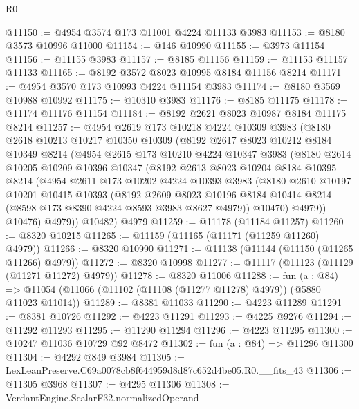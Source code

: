 \begin{lexlean}{R0}
\begin{coremodule}
@11150 := @4954 @3574 @173 @11001 @4224 @11133 @3983
@11153 := @8180 @3573 @10996 @11000
@11154 := @146 @10990
@11155 := @3973 @11154
@11156 := @11155 @3983
@11157 := @8185 @11156
@11159 := @11153 @11157 @11133
@11165 := @8192 @3572 @8023 @10995 @8184 @11156 @8214
@11171 := @4954 @3570 @173 @10993 @4224 @11154 @3983
@11174 := @8180 @3569 @10988 @10992
@11175 := @10310 @3983
@11176 := @8185 @11175
@11178 := @11174 @11176 @11154
@11184 := @8192 @2621 @8023 @10987 @8184 @11175 @8214
@11257 := @4954
    @2619
    @173
    @10218
    @4224
    @10309
    @3983
    (@8180
      @2618
      @10213
      @10217
      @10350
      @10309
      (@8192
        @2617
        @8023
        @10212
        @8184
        @10349
        @8214
        (@4954
          @2615
          @173
          @10210
          @4224
          @10347
          @3983
          (@8180
            @2614
            @10205
            @10209
            @10396
            @10347
            (@8192
              @2613
              @8023
              @10204
              @8184
              @10395
              @8214
              (@4954
                @2611
                @173
                @10202
                @4224
                @10393
                @3983
                (@8180
                  @2610
                  @10197
                  @10201
                  @10415
                  @10393
                  (@8192
                    @2609
                    @8023
                    @10196
                    @8184
                    @10414
                    @8214
                    (@8598 @173 @8390 @4224 @8593 @3983 @8627 @4979))
                  @10470)
                @4979))
            @10476)
          @4979))
      @10482)
    @4979
@11259 := @11178 (@11184 @11257)
@11260 := @8320 @10215
@11265 := @11159 (@11165 (@11171 (@11259 @11260) @4979))
@11266 := @8320 @10990
@11271 := @11138 (@11144 (@11150 (@11265 @11266) @4979))
@11272 := @8320 @10998
@11277 := @11117 (@11123 (@11129 (@11271 @11272) @4979))
@11278 := @8320 @11006
@11288 := fun (a : @84) =>
  @11054 (@11066 (@11102 (@11108 (@11277 @11278) @4979)) (@5880 @11023 @11014))
@11289 := @8381 @11033
@11290 := @4223 @11289
@11291 := @8381 @10726
@11292 := @4223 @11291
@11293 := @4225 @9276
@11294 := @11292 @11293
@11295 := @11290 @11294
@11296 := @4223 @11295
@11300 := @10247 @11036 @10729 @92 @8472
@11302 := fun (a : @84) => @11296 @11300
@11304 := @4292 @849 @3984
@11305 := LexLeanPreserve.C69a0078cb8f644959d8d87c652d4be05.R0.__fits_43
@11306 := @11305 @3968
@11307 := @4295 @11306
@11308 := VerdantEngine.ScalarF32.normalizedOperand

\end{coremodule}
\end{lexlean}
